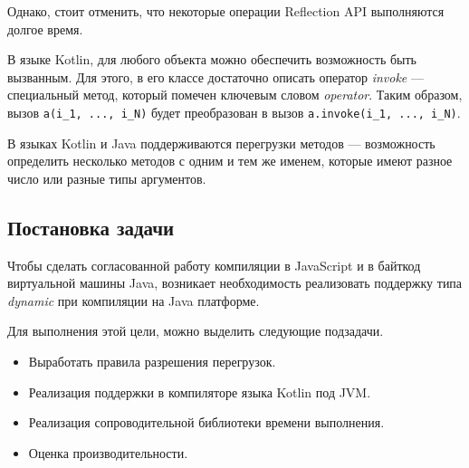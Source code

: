 Однако, стоит отменить, что некоторые операции Reflection API выполняются долгое время.


В языке Kotlin, для любого объекта можно обеспечить возможность быть вызванным. Для этого, в его классе достаточно описать оператор \textit{invoke} --- специальный метод, который помечен ключевым словом \textit{operator}. Таким образом, вызов \texttt{a(i_1, ..., i_N)} будет преобразован в вызов \texttt{a.invoke(i_1, ..., i_N)}.

В языках Kotlin и Java поддерживаются перегрузки методов --- возможность определить несколько методов с одним и тем же именем, которые имеют разное число или разные типы аргументов.



\subsection{Постановка задачи}

Чтобы сделать согласованной работу компиляции в JavaScript и в байткод виртуальной машины Java, возникает необходимость реализовать поддержку типа \textit{dynamic} при компиляции на Java платформе.

Для выполнения этой цели, можно выделить следующие подзадачи.
\begin{itemize}
    \item Выработать правила разрешения перегрузок.
    \item Реализация поддержки в компиляторе языка Kotlin под JVM.
    \item Реализация сопроводительной библиотеки времени выполнения.
    \item Оценка производительности.
\end{itemize}

